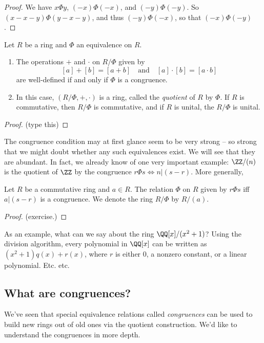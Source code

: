 \documentclass{article}
\begin{document}
\begin{proof}
We have $x \Phi y$, $(-x) \Phi (-x)$, and $(-y) \Phi (-y)$. So $(x-x-y)\Phi(y-x-y)$, and thus $(-y)\Phi(-x)$, so that $(-x)\Phi(-y)$.
\end{proof}

\begin{prop}
Let $R$ be a ring and $\Phi$ an equivalence on $R$.
\begin{enumerate}
\item The operations $+$ and $\cdot$ on $R/\Phi$ given by \[ [a] + [b] = [a+b] \quad \mathrm{and} \quad [a] \cdot [b] = [a \cdot b] \] are well-defined if and only if $\Phi$ is a congruence.
\item In this case, $(R/\Phi, +, \cdot)$ is a ring, called the \emph{quotient} of $R$ by $\Phi$. If $R$ is commutative, then $R/\Phi$ is commutative, and if $R$ is unital, the $R/\Phi$ is unital.
\end{enumerate}
\end{prop}

\begin{proof}
(type this)
\end{proof}

The congruence condition may at first glance seem to be very strong -- so strong that we might doubt whether any such equivalences exist. We will see that they are abundant. In fact, we already know of one very important example: $\ZZ/(n)$ is the quotient of $\ZZ$ by the congruence $r \Phi s \Leftrightarrow n|(s-r)$. More generally,

\begin{prop}
Let $R$ be a commutative ring and $a \in R$. The relation $\Phi$ on $R$ given by $r \Phi s$ iff $a | (s-r)$ is a congruence. We denote the ring $R/\Phi$ by $R/(a)$.
\end{prop}

\begin{proof}
(exercise.)
\end{proof}

As an example, what can we say about the ring $\QQ[x]/(x^2 + 1)$? Using the division algorithm, every polynomial in $\QQ[x]$ can be written as $(x^2+1)q(x) + r(x)$, where $r$ is either 0, a nonzero constant, or a linear polynomial. Etc. etc.

\subsection*{What are congruences?}

We've seen that special equivalence relations called \emph{congruences} can be used to build new rings out of old ones via the quotient construction. We'd like to understand the congruences in more depth.
\end{document}
